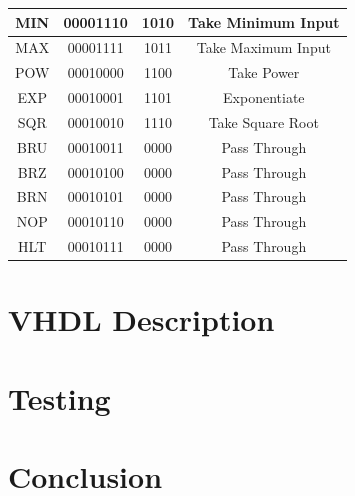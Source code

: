 \documentclass[a4paper,14pt]{article}
\begin{document}
\begin{table}[!h]
\begin{tabular}{llll}
\multicolumn{1}{|c|}{MIN} & \multicolumn{1}{c|}{00001110} & \multicolumn{1}{c|}{1010} & \multicolumn{1}{c|}{Take Minimum Input} \TBstrut \\[1em] \hline
\multicolumn{1}{|c|}{MAX} & \multicolumn{1}{c|}{00001111} & \multicolumn{1}{c|}{1011} & \multicolumn{1}{c|}{Take Maximum Input} \TBstrut \\[1em] \hline
\multicolumn{1}{|c|}{POW} & \multicolumn{1}{c|}{00010000} & \multicolumn{1}{c|}{1100} & \multicolumn{1}{c|}{Take Power} \TBstrut \\[1em] \hline
\multicolumn{1}{|c|}{EXP} & \multicolumn{1}{c|}{00010001} & \multicolumn{1}{c|}{1101} & \multicolumn{1}{c|}{Exponentiate} \TBstrut \\[1em] \hline
\multicolumn{1}{|c|}{SQR} & \multicolumn{1}{c|}{00010010} & \multicolumn{1}{c|}{1110} & \multicolumn{1}{c|}{Take Square Root} \TBstrut \\[1em] \hline
\multicolumn{1}{|c|}{BRU} & \multicolumn{1}{c|}{00010011} & \multicolumn{1}{c|}{0000} & \multicolumn{1}{c|}{Pass Through} \TBstrut \\[1em] \hline
\multicolumn{1}{|c|}{BRZ} & \multicolumn{1}{c|}{00010100} & \multicolumn{1}{c|}{0000} & \multicolumn{1}{c|}{Pass Through} \TBstrut \\[1em] \hline
\multicolumn{1}{|c|}{BRN} & \multicolumn{1}{c|}{00010101} & \multicolumn{1}{c|}{0000} & \multicolumn{1}{c|}{Pass Through} \TBstrut \\[1em] \hline
\multicolumn{1}{|c|}{NOP} & \multicolumn{1}{c|}{00010110} & \multicolumn{1}{c|}{0000} & \multicolumn{1}{c|}{Pass Through} \TBstrut \\[1em] \hline
\multicolumn{1}{|c|}{HLT} & \multicolumn{1}{c|}{00010111} & \multicolumn{1}{c|}{0000} & \multicolumn{1}{c|}{Pass Through} \TBstrut \\[1em] \hline
\end{tabular}
\end{table}

\section{VHDL Description}
\section{Testing}
\section{Conclusion}
\end{document}
